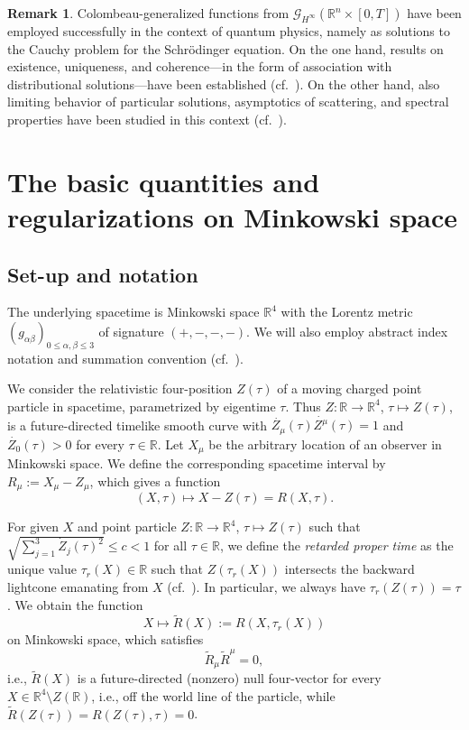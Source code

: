 \documentclass[sumlimits,intlimits,namelimits%
]{amsart}
\newcommand{\G}{\ensuremath{\mathcal{G}}}
\newcommand{\mb}[1]{\ensuremath{\mathbb{#1}}}
\newcommand{\R}{\mb{R}}
\theoremstyle{definition}
\newtheorem{remark}[theorem]{Remark}
\newcommand{\col}{\colon}
\newcommand{\al}{\alpha}
\newcommand{\be}{\beta}
\begin{document}
\begin{remark}
Colombeau-generalized functions from $\G_{H^\infty} (\R^n \times [0,T])$ have been employed successfully in the context of quantum physics, namely as solutions to the Cauchy problem for the Schr\"odinger equation. On the one hand, results  on existence, uniqueness, and coherence---in the form of association with distributional solutions---have been established (cf.\ \cite{Hoermann:11}). On the other hand, also limiting behavior of particular solutions, asymptotics of scattering, and spectral properties have been studied in this context (cf.\  \cite{Hoermann:17, HOS:25}).
\end{remark}

\section{The basic quantities and regularizations on Minkowski space}\label{SecMink}

\subsection{Set-up and notation}

The underlying spacetime is Minkowski space $\R^4$ with the Lorentz metric $(g_{\al \be})_{0 \leq \al, \be \leq 3}$ of signature $(+,-,-,-)$. We will also employ abstract index notation and summation convention (cf.\ \cite[Chapter 2]{PR1}).

We consider the relativistic four-position $Z(\tau)$ of a moving charged point particle in spacetime,  parametrized by eigentime $\tau$. Thus $Z \col \R \to \R^4$, $\tau \mapsto Z(\tau)$, is a future-directed timelike smooth curve  with $\dot{Z_\mu}(\tau) \dot{Z^\mu}(\tau) = 1$ and $\dot{Z_0}(\tau) > 0$ for every $\tau \in \R$. 
Let $X_\mu$ be the arbitrary location of an observer in Minkowski space. 
We define the corresponding spacetime interval by $R_\mu := X_\mu-Z_\mu$, which gives a function 
$$
     (X,\tau) \mapsto X - Z(\tau) = R(X,\tau).
$$ 

For given $X$ and point particle $Z \col \R \to \R^4$, $\tau \mapsto Z(\tau)$ such that $\sqrt{\sum_{j=1}^3 \dot{Z}_j(\tau)^2} \leq c < 1$ for all $\tau \in \R$, we define the \emph{retarded proper time} as the unique value $\tau_r(X) \in \R$ such that $Z(\tau_r(X))$ intersects the backward lightcone emanating from $X$ (cf.\ \cite[Section 4.2 and Exercise 4.1]{Parrott}). In particular, we always have $\tau_r(Z(\tau)) = \tau$.  We  obtain the function 
$$
  X \mapsto \widetilde{R}(X) := R(X,\tau_r(X))
$$ 
on Minkowski space, which satisfies
\[
\widetilde{R}_\mu \widetilde{R}^\mu=0,
\]
i.e., $\widetilde{R}(X)$ is a future-directed (nonzero) null four-vector for every $X \in \R^4 \setminus Z(\R)$, i.e., off the world line of the particle, while $\widetilde{R}(Z(\tau)) = R(Z(\tau),\tau) = 0$.
\end{document}
